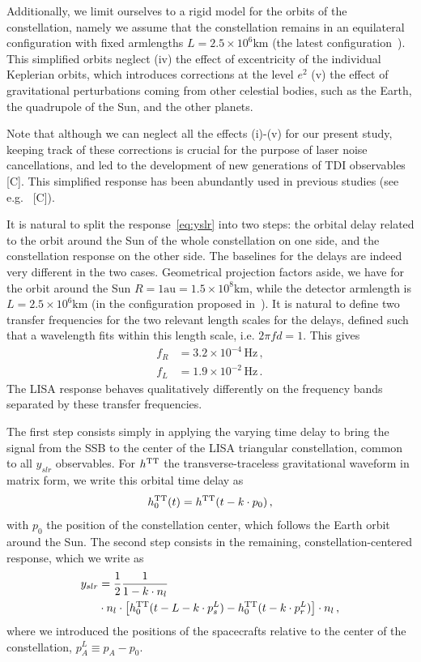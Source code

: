 \documentclass[aps,showpacs,twocolumn,
prd,superscriptaddress,nofootinbib]{revtex4-1}
\newcommand{\be}{\begin{equation}}
\newcommand{\ee}{\end{equation}}
\newcommand{\nn}{\nonumber}
\newcommand{\hatk}{k}
\newcommand{\Hz}{\,\mathrm{Hz}}
\newcommand{\SM}[1]{{\color{Red} #1}}
\begin{document}
Additionally, we limit ourselves to a rigid model for the orbits of the constellation, namely we assume that the constellation remains in an equilateral configuration with fixed armlengths $L=2.5\times 10^{6}\mathrm{km}$ (the latest configuration~\cite{LISA17}). This simplified orbits neglect (iv) the effect of excentricity of the individual Keplerian orbits, which introduces corrections at the level $e^{2}$ (v) the effect of gravitational perturbations coming from other celestial bodies, such as the Earth, the quadrupole of the Sun, and the other planets. 

Note that although we can neglect all the effects (i)-(v) for our present study, keeping track of these corrections is crucial for the purpose of laser noise cancellations, and led to the development of new generations of TDI observables~\cite{} \SM{[C]}. This simplified response has been abundantly used in previous studies (see e.g.~\cite{} \SM{[C]}).

It is natural to split the response~\eqref{eq:yslr} into two steps: the orbital delay related to the orbit around the Sun of the whole constellation on one side, and the constellation response on the other side. The baselines for the delays are indeed very different in the two cases. Geometrical projection factors aside, we have for the orbit around the Sun $R=1\text{au}=1.5\times 10^{8} \text{km}$, while the detector armlength is $L=2.5\times 10^{6}\text{km}$ (in the configuration proposed in~\cite{LISA17}). It is natural to define two transfer frequencies for the two relevant length scales for the delays, defined such that a wavelength fits within this length scale, i.e. $2\pi f d = 1$. This gives
\begin{subequations}\label{eq:transferfrequencies}
\begin{align}
	f_{R} &= 3.2\times10^{-4}\Hz \,,\\
	f_{L} &= 1.9\times 10^{-2}\Hz \,.
\end{align}
\end{subequations}
The LISA response behaves qualitatively differently on the frequency bands separated by these transfer frequencies.

The first step consists simply in applying the varying time delay to bring the signal from the SSB to the center of the LISA triangular constellation, common to all $y_{slr}$ observables. For $h^{\rm TT}$ the transverse-traceless gravitational waveform in matrix form, we write this orbital time delay as
\be\label{eq:defresponse0}
	h_{0}^{\rm TT} (t) = h^{\rm TT}(t-\hatk\cdot p_{0}) \,,
\ee
with $p_{0}$ the position of the constellation center, which follows the Earth orbit around the Sun. The second step consists in the remaining, constellation-centered response, which we write as
\begin{align}\label{eq:defresponseL}
	y_{slr} &= \frac{1}{2} \frac{1}{1 - \hatk\cdot n_{l}} \nn\\
	& \cdot n_{l}\cdot \left[ h_{0}^{\rm TT}(t - L - \hatk\cdot p^{L}_{s}) - h_{0}^{\rm TT}(t - \hatk\cdot p^{L}_{r}) \right] \cdot n_{l}\,,
\end{align}
where we introduced the positions of the spacecrafts relative to the center of the constellation, $p^{L}_{A} \equiv p_{A} - p_{0}$.
\end{document}
